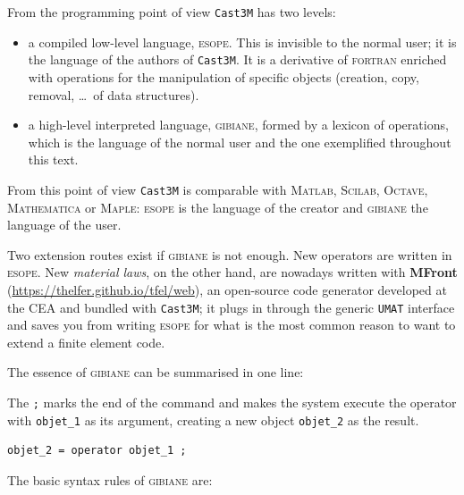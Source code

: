 From the programming point of view \texttt{Cast3M} has two levels:

\begin{itemize}
\item a compiled low-level language, \textsc{esope}. This is invisible to the
  normal user; it is the language of the authors of \texttt{Cast3M}. It is a
  derivative of \textsc{fortran} enriched with operations for the manipulation
  of specific objects (creation, copy, removal, \ldots\ of data structures).
\item a high-level interpreted language, \textsc{gibiane}, formed by a lexicon
  of operations, which is the language of the normal user and the one
  exemplified throughout this text.
\end{itemize}

\noindent From this point of view \texttt{Cast3M} is comparable with
\textsc{Matlab}, \textsc{Scilab}, \textsc{Octave}, \textsc{Mathematica} or
\textsc{Maple}: \textsc{esope} is the language of the creator and
\textsc{gibiane} the language of the user.

Two extension routes exist if \textsc{gibiane} is not enough. New operators
are written in \textsc{esope}. New \emph{material laws}, on the other hand,
are nowadays written with \textbf{MFront}
(\url{https://thelfer.github.io/tfel/web}), an open-source code generator
developed at the CEA and bundled with \texttt{Cast3M}; it plugs in through the
generic \texttt{UMAT} interface and saves you from writing \textsc{esope} for
what is the most common reason to want to extend a finite element code.

The essence of \textsc{gibiane} can be summarised in one line:

\begin{castemcom}
The \texttt{;} marks the end of the command and makes the system execute the
operator with \texttt{objet\_1} as its argument, creating a new object
\texttt{objet\_2} as the result.
\end{castemcom}
\begin{castemlines}
\begin{verbatim}
objet_2 = operator objet_1 ;
\end{verbatim}
\end{castemlines}

\noindent The basic syntax rules of \textsc{gibiane} are:

